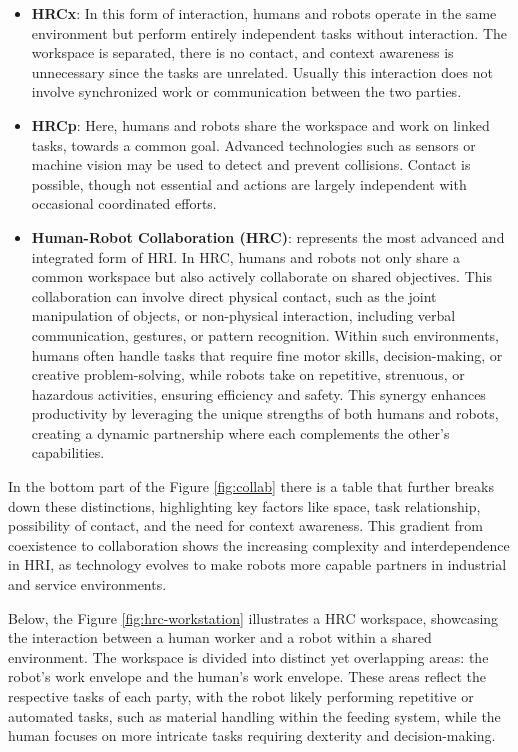 \begin{itemize}
    \item \textbf{\ac{HRCx}}: In this form of interaction, humans and robots operate in the same environment but perform entirely independent tasks without interaction. The workspace is separated, there is no contact, and context awareness is unnecessary since the tasks are unrelated.
    Usually this interaction does not involve synchronized work or communication between the two parties. 

    \item \textbf{\ac{HRCp}}: Here, humans and robots share the workspace and work on linked tasks, towards a common goal. Advanced technologies such as sensors or machine vision may be used to detect and prevent collisions. Contact is possible, though not essential and actions are largely independent  with occasional coordinated efforts.

    \item \textbf{Human-Robot Collaboration (\ac{HRC})}: represents the most advanced and integrated form of \ac{HRI}. In \ac{HRC}, humans and robots not only share a common workspace but also actively collaborate on shared objectives. This collaboration can involve direct physical contact, such as the joint manipulation of objects, or non-physical interaction, including verbal communication, gestures, or pattern recognition.
    Within such environments, humans often handle tasks that require fine motor skills, decision-making, or creative problem-solving, while robots take on repetitive, strenuous, or hazardous activities, ensuring efficiency and safety. This synergy enhances productivity by leveraging the unique strengths of both humans and robots, creating a dynamic partnership where each complements the other’s capabilities.

\end{itemize}

In the bottom part of the Figure \ref{fig:collab} there is a table that further breaks down these distinctions, highlighting key factors like space, task relationship, possibility of contact, and the need for context awareness. This gradient from coexistence to collaboration shows the increasing complexity and interdependence in \ac{HRI}, as technology evolves to make robots more capable partners in industrial and service environments.

Below, the Figure \ref{fig:hrc-workstation} illustrates a \ac{HRC} workspace, showcasing the interaction between a human worker and a robot within a shared environment. The workspace is divided into distinct yet overlapping areas: the robot's work envelope and the human's work envelope. These areas reflect the respective tasks of each party, with the robot likely performing repetitive or automated tasks, such as material handling within the feeding system, while the human focuses on more intricate tasks requiring dexterity and decision-making.

